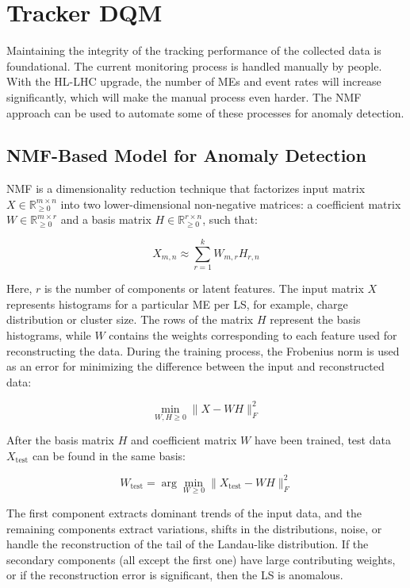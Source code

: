 \chapter{Tracker DQM}

Maintaining the integrity of the tracking performance of the collected data is foundational. The current monitoring process is handled manually by people. With the HL-LHC upgrade, the number of MEs and event rates will increase significantly, which will make the manual process even harder. The NMF approach can be used to automate some of these processes for anomaly detection.

\section{NMF-Based Model for Anomaly Detection}

NMF is a dimensionality reduction technique that factorizes input matrix \( X \in \mathbb{R}_{\geq 0}^{m \times n} \) into two lower-dimensional non-negative matrices: a coefficient matrix \( W \in \mathbb{R}_{\geq 0}^{m \times r} \) and a basis matrix \( H \in \mathbb{R}_{\geq 0}^{r \times n} \), such that:

\begin{equation}
    X_{m,n} \approx \sum_{r=1}^{k} W_{m,r} H_{r,n}
\end{equation}

Here, \( r \) is the number of components or latent features. The input matrix \( X \) represents histograms for a particular ME per LS, for example, charge distribution or cluster size. The rows of the matrix \( H \) represent the basis histograms, while \( W \) contains the weights corresponding to each feature used for reconstructing the data. During the training process, the Frobenius norm is used as an error for minimizing the difference between the input and reconstructed data:

\begin{equation}
    \min_{W, H \geq 0} \| X - WH \|_F^2
\end{equation}

After the basis matrix \( H \) and coefficient matrix \( W \) have been trained, test data \( X_{\text{test}} \) can be found in the same basis:

\begin{equation}
    W_{\text{test}} = \arg \min_{W \geq 0} \| X_{\text{test}} - WH \|_F^2
\end{equation}

The first component extracts dominant trends of the input data, and the remaining components extract variations, shifts in the distributions, noise, or handle the reconstruction of the tail of the Landau-like distribution. If the secondary components (all except the first one) have large contributing weights, or if the reconstruction error is significant, then the LS is anomalous.

